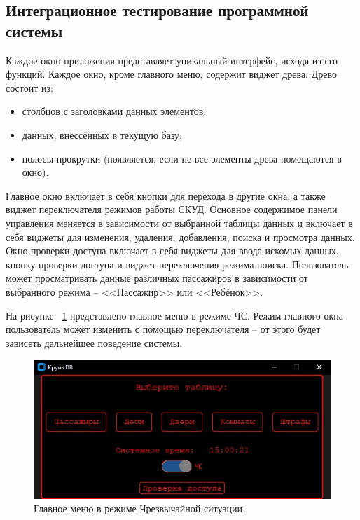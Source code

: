 \subsection{Интеграционное тестирование программной системы}
Каждое окно приложения представляет уникальный интерфейс, исходя из его функций.  Каждое окно, кроме главного меню, содержит виджет древа.
Древо состоит из:
\begin{itemize}
	\item столбцов с заголовками данных элементов;
	\item данных, внессённых в текущую базу;
	\item полосы прокрутки (появляется, если не все элементы древа помещаются в окно).
\end{itemize}
Главное окно включает в себя кнопки для перехода в другие окна, а также виджет переключателя режимов работы СКУД.
Основное содержимое панели управления меняется в зависимости от выбранной таблицы данных и включает в себя виджеты для изменения, удаления, добавления, поиска и просмотра данных.
Окно проверки доступа включает в себя виджеты для ввода искомых данных, кнопку проверки доступа и виджет переключения режима поиска. Пользователь может просматривать данные различных пассажиров в зависимости от выбранного режима -- <<Пассажир>> или <<Ребёнок>>.

На рисунке ~\ref{fig:example4} представлено главное меню в режиме ЧС.
Режим главного окна пользователь может изменить с помощью переключателя -- от этого будет зависеть дальнейшее поведение системы.
\begin{figure}[H]
	\centering
	\includegraphics[width=1.0\linewidth]{images/Example4}
	\caption{Главное меню в режиме Чрезвычайной ситуации}
	\label{fig:example4}
\end{figure}


